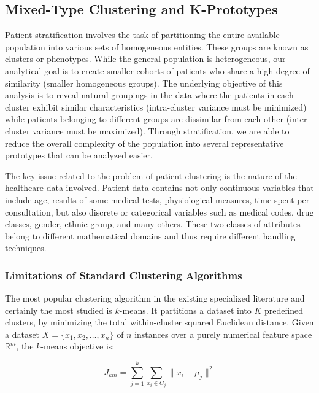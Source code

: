 \subsection{Mixed-Type Clustering and K-Prototypes}

Patient stratification involves the task of partitioning the entire available population into various sets of homogeneous entities. These groups are known as clusters or phenotypes. While the general population is heterogeneous, our analytical goal is to create smaller cohorts of patients who share a high degree of similarity (smaller homogeneous groups). The underlying objective of this analysis is to reveal natural groupings in the data where the patients in each cluster exhibit similar characteristics (intra-cluster variance must be minimized) while patients belonging to different groups are dissimilar from each other (inter-cluster variance must be maximized). Through stratification, we are able to reduce the overall complexity of the population into several representative prototypes that can be analyzed easier.

The key issue related to the problem of patient clustering is the nature of the healthcare data involved. Patient data contains not only continuous variables that include age, results of some medical tests, physiological measures, time spent per consultation, but also discrete or categorical variables such as medical codes, drug classes, gender, ethnic group, and many others. These two classes of attributes belong to different mathematical domains and thus require different handling techniques.

\subsubsection{Limitations of Standard Clustering Algorithms}
\label{ch:clustering_limitations}

The most popular clustering algorithm in the existing specialized literature and certainly the most studied is $k$-means. It partitions a dataset into $K$ predefined clusters, by minimizing the total within-cluster squared Euclidean distance. Given a dataset $X = \{x_1, x_2, \ldots, x_n\}$ of $n$ instances over a purely numerical feature space $\mathbb{R}^m$, the $k$-means objective is:

\begin{equation}
    J_{km} = \sum_{j=1}^{k} \sum_{x_i \in C_j} \|x_i - \mu_j\|^2
    \label{eq:kmeans}
\end{equation}

